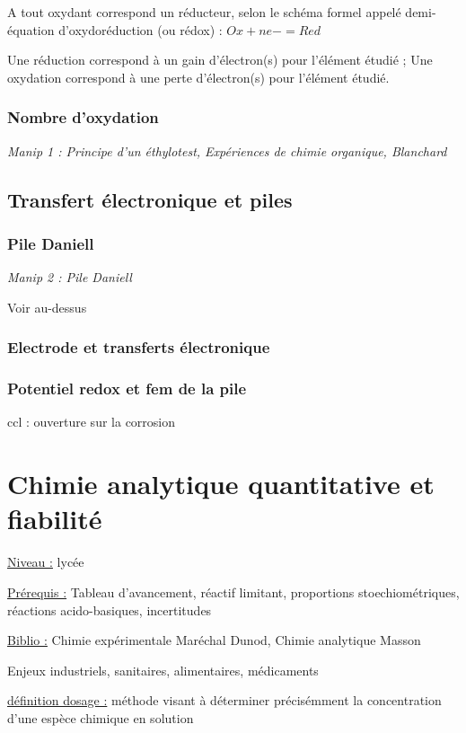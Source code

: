 \documentclass{article}%
\begin{document}
A tout oxydant correspond un réducteur, selon le schéma formel appelé demi-équation d’oxydoréduction
(ou rédox) : $Ox + n e- = Red$

Une réduction correspond à un gain d’électron(s) pour l’élément étudié ;
Une oxydation correspond à une perte d’électron(s) pour l’élément étudié.

\subsubsection{Nombre d'oxydation}

\textit{Manip 1 : Principe d'un éthylotest, Expériences de chimie organique, Blanchard}
\subsection{Transfert électronique et piles}

\subsubsection{Pile Daniell}
\textit{Manip 2 : Pile Daniell}

Voir au-dessus

\subsubsection{Electrode et transferts électronique}

\subsubsection{Potentiel redox et fem de la pile}

ccl : ouverture sur la corrosion
\section{Chimie analytique quantitative et fiabilité}
\underline{Niveau :} lycée

\underline{Prérequis :} Tableau d'avancement, réactif limitant, proportions stoechiométriques, réactions acido-basiques, incertitudes

\underline{Biblio :} Chimie expérimentale Maréchal Dunod, Chimie analytique Masson

Enjeux industriels, sanitaires, alimentaires, médicaments

\underline{définition dosage :} méthode visant à déterminer précisémment la concentration d'une espèce chimique en solution
\end{document}
